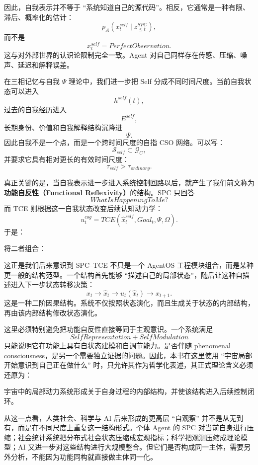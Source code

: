 因此，自我表示并不等于 ``系统知道自己的源代码''。相反，它通常是一种有限、滞后、概率化的估计：
\[
p_A
\left(
x_t^{self}
\mid
z_{\leq t}^{SPC}
\right),
\]
而不是
\[
x_t^{self}
=
PerfectObservation.
\]
这与对外部世界的认识论限制完全一致。Agent 对自己同样存在传感、压缩、噪声、延迟和解释误差。

在三相记忆与自我 $\Psi$ 理论中，我们进一步把 Self 分成不同时间尺度。当前自我状态可以进入
\[
h^{self}(t),
\]
过去的自我经历进入
\[
E^{self},
\]
长期身份、价值和自我解释结构沉降进
\[
\Psi.
\]
因此自我不是一个点，而是一个跨时间尺度的自指 CSO 网络。可以写：
\[
\mathcal S_{self}
\subset
\mathcal G_C,
\]
并要求它具有相对更长的有效时间尺度：
\[
\tau_{self}
>
\tau_{ordinary}.
\]

真正关键的是，当自我表示进一步进入系统控制回路以后，就产生了我们前文称为\textbf{功能自反性（Functional Reflexivity）}的结构。SPC 只回答
\[
WhatIsHappeningToMe?
\]
而 TCE 则根据这一自我状态改变后续认知动力学：
\[
u^{cog}_t
=
TCE(
\hat x^{self}_t,
Goal_t,
\Psi,
\Omega
).
\]
于是：
\begin{statementbox}
\centering
{}
\end{statementbox}

将二者组合：
\begin{statementbox}
\centering
{}
\end{statementbox}

这正是我们后来意识到 SPC--TCE 不只是一个 AgentOS 工程模块组合，而是某种更一般的结构范型。一个结构首先能够 ``描述自己的局部状态''，随后让这种自描述进入下一步状态转移决策：
\[
x_t
\rightarrow
\hat x_t
\rightarrow
u_t(\hat x_t)
\rightarrow
x_{t+1}.
\]
这是一种二阶因果结构。系统不仅按照状态演化，而且生成关于状态的内部结构，再由该内部结构修改状态演化。

这里必须特别避免把功能自反性直接等同于主观意识。一个系统满足
\[
SelfRepresentation+SelfModulation
\]
只能说明它在功能上具有自状态建模和自调节能力。是否伴随 phenomenal consciousness，是另一个需要独立证据的问题。因此，本书在这里使用 ``宇宙局部开始意识到自己正在做什么'' 时，只允许其作为哲学化表述，其正式理论含义必须还原为：
\begin{statementbox}
宇宙中的局部动力系统形成关于自身过程的内部结构，并使该结构进入后续控制闭环。
\end{statementbox}

从这一点看，人类社会、科学与 AI 后来形成的更高层 ``自观察'' 并不是从无到有，而是在不同尺度上重复这一结构形式。个体 Agent 的 SPC 对当前自身进行压缩；社会统计系统把分布式社会状态压缩成宏观指标；科学把观测压缩成理论模型；AI 又进一步对这些结构进行大规模整合。但它们是否构成同一主体，需要另外分析，不能因为功能同构就直接做主体同一化。

